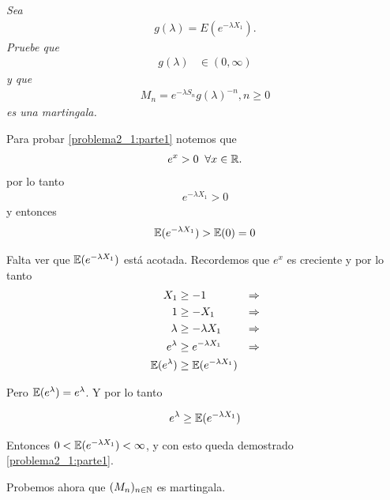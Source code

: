 \emph{
    Sea
        \begin{align}
                g(\lambda)=E(e^{- \lambda X_1}).
        \end{align} 
    Pruebe que 
        \begin{align}
                g(\lambda)    &\in (0,\infty)\label{problema2_1:parte1}
        \end{align}        
    y que
        \begin{align}
                M_n=e^{-\lambda S_n}g(\lambda)^{-n},n\geq 0
        \end{align}
    es una martingala.\\
}
    
    Para probar \eqref{problema2_1:parte1} notemos que
    \begin{align}
        e^x > 0 \;\; \forall x \in \mathbb{R}.
    \end{align}
    por lo tanto
    \begin{align}
        e^{-\lambda X_1} > 0
    \end{align}
    y entonces
    \begin{align}
        \mathbb{E}(e^{-\lambda X_1}) >\mathbb{E}(0) = 0
    \end{align}

    Falta ver que $\mathbb{E}(e^{-\lambda X_1})$ está acotada. Recordemos que $e^x$ es creciente y por lo tanto
    \begin{align}
        X_1                &\geq     -1                       & \Rightarrow\\
        1                  &\geq     - X_1                    & \Rightarrow\\
        \lambda            &\geq     - \lambda X_1            & \Rightarrow\\
        e^{\lambda}        &\geq     e^{- \lambda X_1}        & \Rightarrow\\
        \mathbb{E}(e^{\lambda})    &\geq     \mathbb{E}(e^{- \lambda X_1})
    \end{align}
    
    Pero $\mathbb{E}(e^{\lambda}) = e^{\lambda}$. Y por lo tanto
    
    \begin{align}
        e^{\lambda} \geq  \mathbb{E}(e^{- \lambda X_1})
    \end{align}    
    
    Entonces $0 < \mathbb{E}(e^{-\lambda X_1}) < \infty$, y con esto queda demostrado \eqref{problema2_1:parte1}.
    
    Probemos ahora que $(M_n)_{n \in \mathbb{N}}$ es martingala.
    
